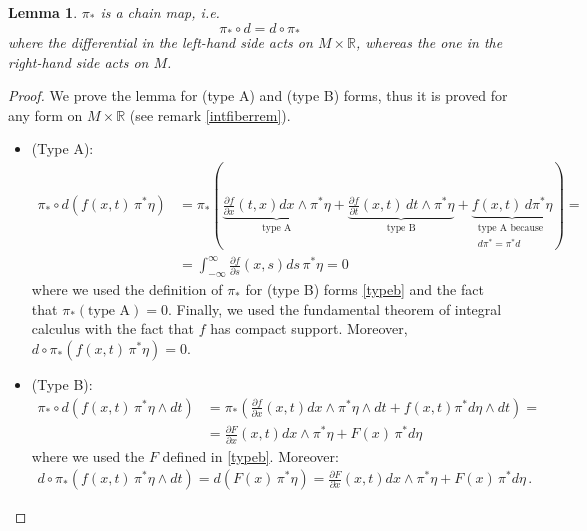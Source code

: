 \documentclass[a4paper,11pt,titlepage, article, oneside]{memoir}
\numberwithin{equation}{section}
\newtheorem{lemma}[theorem]{Lemma}
\theoremstyle{definition}
\theoremstyle{remark}
\newcommand{\rfield}{\mathbb{R}}
\newcommand{\defonde}[2]{\frac{\partial {#1}}{\partial {#2}}}
\begin{document}
\begin{lemma} \label{pichain}
$\pi_*$ is a chain map, i.e.
\begin{equation}
\pi_* \circ d  = d \circ \pi_*
\end{equation}
where the differential in the left-hand side acts on $M \times \rfield$, whereas the one in the right-hand side acts on $M$.
\end{lemma}
\begin{proof}
We prove the lemma for (type A) and (type B) forms, thus it is proved for any form on $M \times \rfield$ (see remark \ref{intfiberrem}).
\begin{itemize}
\item(Type A):
\begin{align*}
\pi_* \circ d \left ( f(x, t) \,\pi^* \eta \right ) &= \pi_* \left ( \underbrace{\defonde{f}{x}(t, x) dx \wedge \pi^* \eta}_{\text{type A}} + \underbrace{\defonde{f}{t}(x, t)\, dt \wedge \pi^* \eta}_{\text{type B}} + \underbrace{f(x, t) \, d\pi^* \eta}_{\substack{\text{type A because } \\ d\pi^*=\pi^*d}} \right ) = \\
&=\int_{-\infty}^{\infty} \defonde{f}{s}(x, s) ds \, \pi^* \eta = 0
\end{align*}
where we used the definition of $\pi_*$ for (type B) forms \eqref{typeb} and  the fact that $\pi_*(\text{type A}) = 0$. Finally, we used the fundamental theorem of integral calculus with the fact that $f$ has compact support.
Moreover, $d \circ \pi_*( f(x, t) \, \pi^*\eta) = 0$.
\item(Type B):
\begin{align*}
\pi_* \circ d (f(x, t) \, \pi^* \eta \wedge dt) &= \pi_* \left ( \defonde{f}{x} (x, t) dx \wedge \pi^*\eta \wedge dt + f(x, t) \pi^* d\eta \wedge dt \right)  = \\
&=\defonde{F}{x}(x, t)dx \wedge \pi^* \eta + F(x) \, \pi^* d\eta
\end{align*}
where we used the $F$ defined in \eqref{typeb}.
Moreover:
\begin{align*}
d \circ \pi_* (f(x, t) \, \pi^* \eta \wedge dt) = d(F(x)\, \pi^*\eta) = \defonde{F}{x}(x, t)dx \wedge \pi^* \eta + F(x) \, \pi^* d\eta  \, .
\end{align*}
\end{itemize}
\end{proof}
\end{document}
